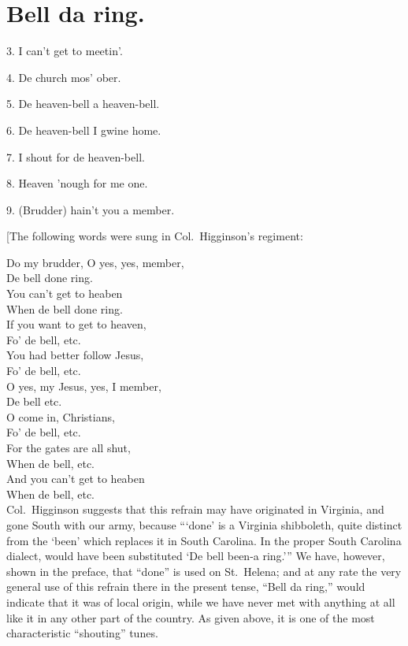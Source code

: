 \documentclass[a5paper,10pt]{book}
\begin{document}
  
\newpage
\section{Bell da ring.}
\thispagestyle{empty}

\begin{song}

\end{song}

\begin{stanza}
\item[3.]
  I can't get to meetin'.\footnotemark[2]
\item[4.]
  De church mos' ober.
\item[5.]
  De heaven-bell a heaven-bell.
\item[6.]
  De heaven-bell I gwine home.
\item[7.]
  I shout for de heaven-bell.
\item[8.]
  Heaven 'nough for me one.
\item[9.]
  (Brudder) hain't you a member.
\end{stanza}

\newpage
\thispagestyle{empty}

[The following words were sung in Col.~Higginson's regiment:

Do my brudder, O yes, yes, member,\\
De bell done ring.\\
You can't get to heaben\\
When de bell done ring.\\
If you want to get to heaven,\\
Fo' de bell, etc.\\
You had better follow Jesus,\\
Fo' de bell, etc.\\
O yes, my Jesus, yes, I member,\\
De bell etc.\\
O come in, Christians,\\
Fo' de bell, etc.\\
For the gates are all shut,\\
When de bell, etc.\\
And you can't get to heaben\\
When de bell, etc.\\

Col.~Higginson suggests that this refrain may have originated in
Virginia, and gone South with our army, because ``{}`done' is a
Virginia shibboleth, quite distinct from the `been' which replaces it
in South Carolina.  In the proper South Carolina dialect, would have
been substituted `De bell been-a ring.'{}'' We have, however, shown in
the preface, that ``done'' is used on St.~Helena; and at any rate the
very general use of this refrain there in the present tense, ``Bell da
ring,'' would indicate that it was of local origin, while we have
never met with anything at all like it in any other part of the
country.  As given above, it is one of the most characteristic
``shouting'' tunes.
\end{document}
